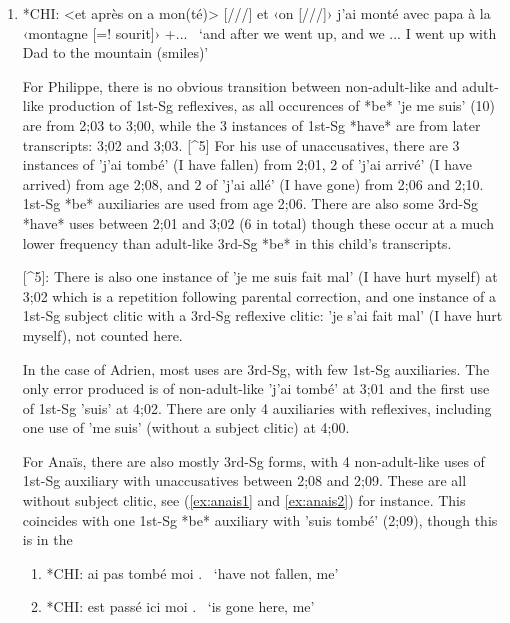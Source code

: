 \documentclass[
  12pt,
]{article}
\begin{document}
\begin{enumerate}[resume*]
  \item{*CHI:   <et après on a mon(té)> [///] et ‹on [///]› j'ai monté avec papa à la ‹montagne [=! sourit]› +...  \label{ex:anae1}}\newline
  \     `and after we went up, and we ... I went up with Dad to the mountain (smiles)'

For Philippe, there is no obvious transition between non-adult-like and adult-like production of 1st-Sg reflexives, as all occurences of *be* 'je me suis' (10) are from 2;03 to 3;00, while the 3 instances of 1st-Sg *have* are from later transcripts: 3;02 and 3;03. [^5] For his use of unaccusatives, there are 3 instances of 'j'ai tombé' (I have fallen) from 2;01, 2 of 'j'ai arrivé' (I have arrived) from age 2;08, and 2 of 'j'ai allé' (I have gone) from 2;06 and 2;10. 1st-Sg *be* auxiliaries are used from age 2;06. There are also some 3rd-Sg *have* uses between 2;01 and 3;02 (6 in total) though these occur at a much lower frequency than adult-like 3rd-Sg *be* in this child's transcripts. 

[^5]: There is also one instance of 'je me suis fait mal' (I have hurt myself) at 3;02 which is a repetition following parental correction, and one instance of a 1st-Sg subject clitic with a 3rd-Sg reflexive clitic: 'je s'ai fait mal' (I have hurt myself), not counted here. 

In the case of Adrien, most uses are 3rd-Sg, with few 1st-Sg auxiliaries. The only error produced is of non-adult-like 'j'ai tombé' at 3;01 and the first use of 1st-Sg 'suis' at 4;02. There are only 4 auxiliaries with reflexives, including one use of 'me suis' (without a subject clitic) at 4;00. 

For Anaïs, there are also mostly 3rd-Sg forms, with 4 non-adult-like uses of 1st-Sg auxiliary with unaccusatives between 2;08 and 2;09. These are all without subject clitic, see (\ref{ex:anais1} and \ref{ex:anais2}) for instance. This coincides with one 1st-Sg *be* auxiliary with 'suis tombé' (2;09), though this is \textipa{[Zi]} in the %

\begin{enumerate}[resume*]
  \item{*CHI:   ai pas tombé moi .  \label{ex:anais1}}\newline
  \     `have not fallen, me'
  \item{*CHI:   est passé ici moi . \label{ex:anais2}}\newline
  \     `is gone here, me'


\end{enumerate}
\end{enumerate}
\end{document}
